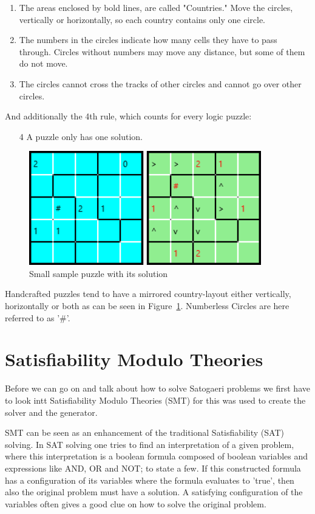 \begin{enumerate}
  \item The areas enclosed by bold lines, are called "Countries." Move the circles, vertically or horizontally, so each country contains only one circle.
  \item The numbers in the circles indicate how many cells they have to pass through. Circles without numbers may move any distance, but some of them do not move.
  \item The circles cannot cross the tracks of other circles and cannot go over other circles. 
\end{enumerate}
And additionally the 4th rule, which counts for every logic puzzle:
\begin{enumerate}
  \item[4] A puzzle only has one solution.
\end{enumerate}

\begin{figure}
  \centering
  \includegraphics[width=0.9\textwidth]{Pictures/sample_small.png} 
  \caption{Small sample puzzle with its solution}
  \label{fig:sample_small}
\end{figure}

Handcrafted puzzles tend to have a mirrored country-layout either vertically, horizontally or both as can be seen in Figure~\ref{fig:sample_small}. Numberless Circles are here referred to as '\#'.

\chapter{Satisfiability Modulo Theories} \label{Satisfiability Modulo Theories}
Before we can go on and talk about how to solve Satogaeri problems we first have to look intt Satisfiability Modulo Theories (SMT) for this was used to create the solver and the generator.

SMT can be seen as an enhancement of the traditional Satisfiability (SAT) solving. In SAT solving one tries to find an interpretation of a given problem, where this interpretation is a boolean formula composed of boolean variables and expressions like AND, OR and NOT; to state a few. If this constructed formula has a configuration of its variables where the formula evaluates to 'true', then also the original problem must have a solution. A satisfying configuration of the variables often gives a good clue on how to solve the original problem.

